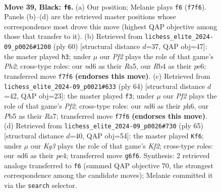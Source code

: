 \documentclass[11pt]{article}
\begin{document}
\clearpage

\begin{figure}[p]\centering
\begin{subfigure}{0.46\textwidth}\centering
\resizebox{\linewidth}{!}{%
\newchessgame
\chessboard[
  setfen={6R1/5pp1/3Np1k1/1p5p/1r1P1P1P/4P1P1/8/6K1 b - - 4 39},
  showmover=false,
  pgfstyle=straightmove, color=movearrow, markmove={f7-f6}
]}
\caption{}
\end{subfigure}\hfill
\begin{subfigure}{0.46\textwidth}\centering
\resizebox{\linewidth}{!}{%
\newchessgame
\chessboard[
  setfen={8/6k1/4p1p1/R4p1p/P4P2/r3PKP1/7P/8 w - - 0 31},
  showmover=false,
  pgfstyle=straightmove, color=movearrow, markmove={h2-h3}
]}
\caption{}
\end{subfigure}
\\[4pt]
\begin{subfigure}{0.46\textwidth}\centering
\resizebox{\linewidth}{!}{%
\newchessgame
\chessboard[
  setfen={8/R4pk1/4p2p/3p1p2/P7/4P1KP/r4PP1/8 w - - 0 33},
  showmover=false,
  pgfstyle=straightmove, color=movearrow, markmove={f2-f3}
]}
\caption{}
\end{subfigure}\hfill
\begin{subfigure}{0.46\textwidth}\centering
\resizebox{\linewidth}{!}{%
\newchessgame
\chessboard[
  setfen={1R6/pp3k2/1r2p2p/4pp2/4P3/1P4P1/P4P1P/3K4 b - - 0 33},
  showmover=false,
  pgfstyle=straightmove, color=movearrow, markmove={f7-f6}
]}
\caption{}
\end{subfigure}
\caption{\textbf{Move 39, Black: \texttt{f6}.} (a) Our position; Melanie plays \texttt{f6} (\texttt{f7f6}). Panels (b)--(d) are the retrieved master positions whose correspondence most drove this move (highest QAP objective among those that transfer to it). (b) Retrieved from \texttt{lichess\_elite\_2024-09\_p0026\#1208} (ply 60) [structural distance $d$=37, QAP obj=47]: the master played \texttt{h3}; under $\mu$ our \emph{Pf2} plays the role of that game's \emph{Ph2}; cross-type roles: our \emph{n}d6 as their \emph{R}a5, our \emph{R}b4 as their \emph{p}e6; transferred move \texttt{f7f6} \textbf{(endorses this move)}. (c) Retrieved from \texttt{lichess\_elite\_2024-09\_p0021\#633} (ply 64) [structural distance $d$=42, QAP obj=23]: the master played \texttt{f3}; under $\mu$ our \emph{Pf2} plays the role of that game's \emph{Pf2}; cross-type roles: our \emph{n}d6 as their \emph{p}h6, our \emph{P}b5 as their \emph{R}a7; transferred move \texttt{f7f6} \textbf{(endorses this move)}. (d) Retrieved from \texttt{lichess\_elite\_2024-09\_p0026\#730} (ply 65) [structural distance $d$=40, QAP obj=54]: the master played \texttt{Kf6}; under $\mu$ our \emph{Kg3} plays the role of that game's \emph{Kf2}; cross-type roles: our \emph{n}d6 as their \emph{p}e4; transferred move \texttt{g6f6}. Synthesis: 2 retrieved analogs transferred to \texttt{f6} (summed QAP objective 70, the strongest correspondence among the candidate moves); Melanie committed it via the \texttt{search} selector.}
\label{fig:thought-m77}
\end{figure}
\end{document}
